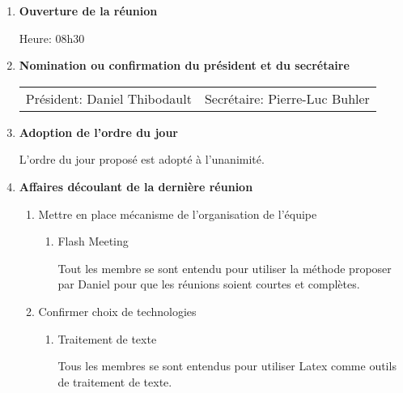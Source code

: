 \documentclass[12pt]{ULojpv}
\begin{document}
\entete
\begin{enumerate}
\item \textbf{Ouverture de la réunion}

Heure: 08h30


\item \textbf{Nomination ou confirmation du président et du secrétaire}

\begin{tabular}{@{}ll}
   Président: Daniel Thibodault
   & Secrétaire: Pierre-Luc Buhler
\end{tabular}


\item \textbf{Adoption de l'ordre du jour}

L'ordre du jour proposé est adopté à l'unanimité.


\item \textbf{Affaires découlant de la dernière réunion}

\begin{enumerate}

\item Mettre en place mécanisme de l'organisation de l'équipe

\begin{enumerate}

\item Flash Meeting

Tout les membre se sont entendu pour utiliser la méthode proposer par Daniel pour que les réunions soient courtes et complètes.






\end{enumerate}

\item Confirmer choix de technologies

\begin{enumerate}
\item Traitement de texte

Tous les membres se sont entendus pour utiliser Latex comme outils de traitement de texte.


\end{enumerate}
\end{enumerate}
\end{enumerate}
\end{document}
